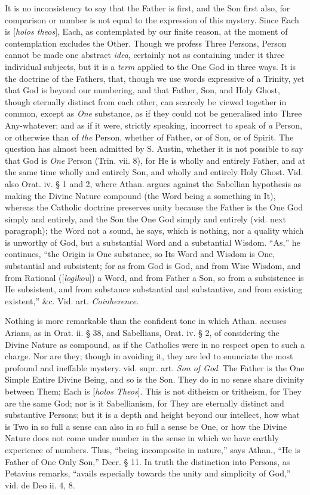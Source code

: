 It is no inconsistency to say that the Father is
first, and the Son first also, for comparison or number is not equal
to the expression of this mystery. Since Each is [\emph{holos theos}],
Each, as contemplated by our finite reason, at the moment of
contemplation excludes the Other. Though we profess Three Persons,
Person cannot be made one abstract \emph{idea}, certainly not as
containing under it three individual subjects, but it is a \emph{term}
applied to the One God in three ways. It is the doctrine of the
Fathers, that, though we use words expressive of a Trinity, yet that
God is beyond our numbering, and that Father, Son, and Holy
Ghost, though eternally distinct from each other, can scarcely be
viewed together in common, except as \emph{One} substance, as if they
could not be generalised into Three Any-whatever; and as if it were,
strictly speaking, incorrect to speak of \emph{a} Person, or otherwise
than of \emph{the} Person, whether of Father, or of Son, or of Spirit.
The question has almost been admitted by S. Austin, whether it is not
possible to say that God is \emph{One} Person (Trin. vii. 8), for He
is wholly and entirely Father, and at the same time wholly and
entirely Son, and wholly and entirely Holy Ghost. Vid. also Orat. iv.
§ 1 and 2, where Athan. argues against the Sabellian hypothesis as
making the Divine Nature compound (the Word being a something in It),
whereas the Catholic doctrine preserves unity because the Father is
the One God simply and entirely, and the Son the One God simply and
entirely (vid. next paragraph); the Word not a sound, he says, which
is nothing, nor a quality which is unworthy of God, but a substantial
Word and a substantial Wisdom. ``As,'' he continues, ``the Origin is One
substance, so Its Word and Wisdom is One, substantial and subsistent;
for as from God is God, and from Wise Wisdom, and from Rational ([\emph{logikou}])
a Word, and from Father a Son, so from a subsistence is He subsistent,
and from substance substantial and substantive, and from existing
existent,'' \&c. Vid. art. \emph{Coinherence}.

Nothing is more remarkable than the confident
tone in which Athan. accuses Arians, as in Orat. ii. § 38, and
Sabellians, Orat. iv. § 2, of considering the Divine Nature as
compound, as if the Catholics were in no respect open to such a
charge. Nor are they; though in avoiding it, they are led to
enunciate the most profound and ineffable mystery. vid. supr. art. \emph{Son
of God}. The Father is the One Simple Entire Divine Being, and so
is the Son. They do in no sense share divinity between Them; Each is [\emph{holos
Theos}]. This is not ditheism or tritheism, for They are the same
God; nor is it Sabellianism, for They are eternally distinct and
substantive Persons; but it is a depth and height beyond our
intellect, how what is Two in so full a sense can also in so full a
sense be One, or how the Divine Nature does not come under number in
the sense in which we have earthly experience of numbers. Thus,
``being incomposite in nature,'' says Athan., ``He is Father of One
Only Son,'' Decr. § 11. In truth the distinction into Persons, as
Petavius remarks, ``avails especially towards the unity and simplicity
of God,'' vid. de Deo ii. 4, 8.

